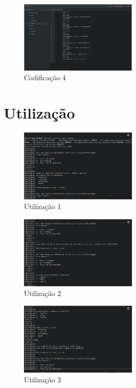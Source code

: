 \documentclass[12pt]{article}
\begin{document}
    \begin{figure}[!ht]
        \centering
        \includegraphics[width=0.5\textwidth]{figures/imagem08.jpeg}
        \caption{Codificação 4}
        \label{fig:imagem8}
    \end{figure}
    

    \vspace{10mm} 
    \section{Utilização}

    \begin{figure}[!ht]
        \centering
        \includegraphics[width=0.5\textwidth]{figures/imagem01.jpeg}
        \caption{Utilização 1}
        \label{fig:imagem5}
    \end{figure}

    \newpage

    \begin{figure}[!ht]
        \centering
        \includegraphics[width=0.5\textwidth]{figures/imagem02.jpeg}
        \caption{Utilização 2}
        \label{fig:imagem6}
    \end{figure}

    \begin{figure}[!ht]
        \centering
        \includegraphics[width=0.5\textwidth]{figures/imagem03.jpeg}
        \caption{Utilização 3}
        \label{fig:imagem5}
    \end{figure}
\end{document}
